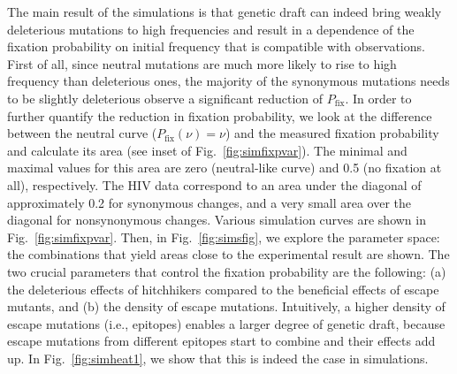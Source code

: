 \documentclass[rmp, twocolumn]{revtex4}
\newcommand{\FIG}[1]{Fig.~\ref{fig:#1}}
\begin{document}
The main result of the simulations is that genetic draft can indeed bring weakly
deleterious mutations to high frequencies and result in a dependence of the
fixation probability on initial frequency that is compatible with observations.
First of all, since neutral mutations are much more likely to rise to high
frequency than deleterious ones, the majority of the synonymous mutations needs
to be slightly deleterious observe a significant reduction of $P_\text{fix}$.
In order to further quantify the reduction in fixation probability, we look at
the difference between the neutral curve ($P_\text{fix}(\nu) = \nu$) and the
measured fixation probability and calculate its area (see inset of
\FIG{simfixpvar}). The minimal and maximal values for this area are zero
(neutral-like curve) and 0.5 (no fixation at all), respectively. The HIV data
correspond to an area under the diagonal of approximately 0.2 for synonymous
changes, and a very small area over the diagonal for nonsynonymous changes.
Various simulation curves are shown in \FIG{simfixpvar}. Then, in
\FIG{simsfig}, we explore the parameter space: the combinations that
yield areas close to the experimental result are shown.
The two crucial parameters that control the fixation probability are the
following: (a) the deleterious effects of hitchhikers compared to the beneficial
effects of escape mutants, and (b) the density of escape mutations. Intuitively,
a higher density of escape mutations (i.e., epitopes) enables a larger degree of
genetic draft, because escape mutations from different epitopes start to combine
and their effects add up. In \FIG{simheat1}, we show that this is indeed the
case in simulations.
\end{document}
